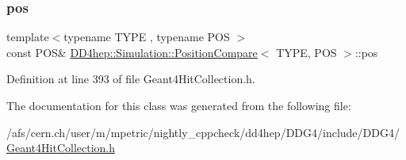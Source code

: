 \subsubsection{\texorpdfstring{pos}{pos}}
{\footnotesize\ttfamily template$<$typename T\+Y\+PE , typename P\+OS $>$ \\
const P\+OS\& \hyperlink{class_d_d4hep_1_1_simulation_1_1_position_compare}{D\+D4hep\+::\+Simulation\+::\+Position\+Compare}$<$ T\+Y\+PE, P\+OS $>$\+::pos}



Definition at line 393 of file Geant4\+Hit\+Collection.\+h.



The documentation for this class was generated from the following file\+:\begin{DoxyCompactItemize}
\item 
/afs/cern.\+ch/user/m/mpetric/nightly\+\_\+cppcheck/dd4hep/\+D\+D\+G4/include/\+D\+D\+G4/\hyperlink{_geant4_hit_collection_8h}{Geant4\+Hit\+Collection.\+h}\end{DoxyCompactItemize}
